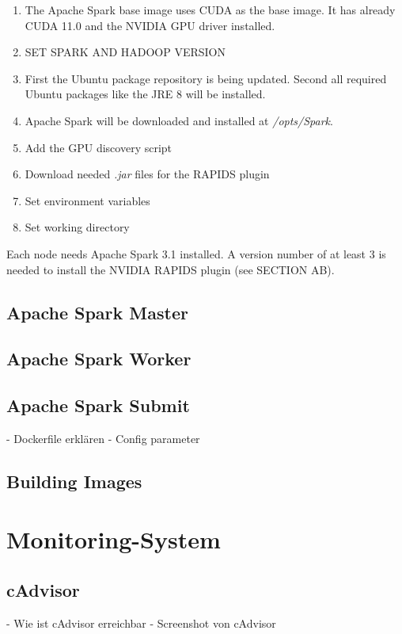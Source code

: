 \begin{enumerate}
\item The Apache Spark base image uses CUDA as the base image. It has already CUDA 11.0 and the NVIDIA GPU driver installed.
\item SET SPARK AND HADOOP VERSION
\item First the Ubuntu package repository is being updated. Second all required Ubuntu packages like the JRE 8 will be installed.
\item Apache Spark will be downloaded and installed at \textit{/opts/Spark}.
\item Add the GPU discovery script
\item Download needed \textit{.jar} files for the RAPIDS plugin
\item Set environment variables
\item Set working directory
\end{enumerate}


Each node needs Apache Spark 3.1 installed. A version number of at least 3 is needed to install the NVIDIA RAPIDS plugin (see SECTION AB).


\subsection{Apache Spark Master}


\subsection{Apache Spark Worker}


\subsection{Apache Spark Submit}
- Dockerfile erklären
- Config parameter


\subsection{Building Images}


\section{Monitoring-System}


\subsection{cAdvisor}
- Wie ist cAdvisor erreichbar
- Screenshot von cAdvisor 


